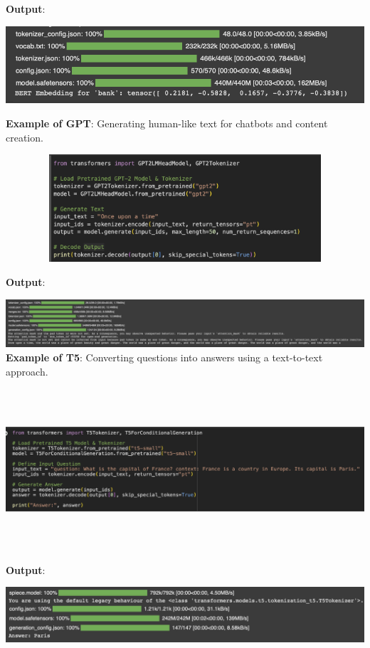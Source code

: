 \documentclass{article}
\begin{document}
\begin{itemize}
\begin{itemize}
\textbf{Output}:

\includegraphics[width=14cm,height=6
cm]{BERT_Output.png}

    \textbf{Example of GPT}: Generating human-like text for chatbots and content creation.

\includegraphics[width=14cm,height=4cm]{GPT.png}

\textbf{Output}:

\includegraphics[width=14cm,height=4
cm]{GPT_Output.png}
\newpage
    \textbf{Example of T5}: Converting questions into answers using a text-to-text approach.

    \includegraphics[width=14cm,height=6cm]{T5.png}

\textbf{Output}:

\includegraphics[width=14cm,height=3
cm]{T5_Output.png}
    \end{itemize}
\end{itemize}
\newpage
\end{document}
